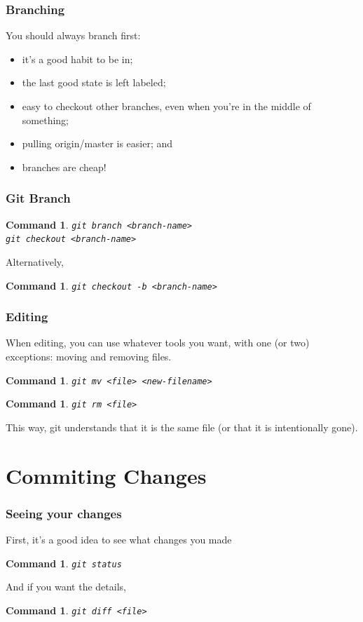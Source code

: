 \documentclass{beamer}
\newtheorem{command}[theorem]{Command}
\begin{document}
\begin{frame}
    \frametitle{Branching}
    You should always branch first:
    \pause
    \begin{itemize}
        \item it's a good habit to be in;
        \item the last good state is left labeled;
        \item easy to checkout other branches, even when you're in the middle of something;
        \item pulling origin/master is easier; and
        \item branches are cheap!
    \end{itemize}
\end{frame}

\begin{frame}
    \frametitle{Git Branch}
    \begin{command}
        \texttt{git branch <branch-name>}\\
        \texttt{git checkout <branch-name>}
    \end{command}
    Alternatively,
    \begin{command}
        \texttt{git checkout -b <branch-name>}
    \end{command}
\end{frame}


\begin{frame}
    \frametitle{Editing}
    When editing, you can use whatever tools you want, with one (or two) exceptions:
    \pause
    moving and removing files.
    \begin{command}
        \texttt{git mv <file> <new-filename>}
    \end{command}
    \begin{command}
        \texttt{git rm <file>}
    \end{command}
    This way, git understands that it is the same file (or that it is intentionally gone).
\end{frame}


\section{Commiting Changes}

\begin{frame}
    \frametitle{Seeing your changes}
    First, it's a good idea to see what changes you made
    \begin{command}
        \texttt{git status}
    \end{command}
    \pause
    And if you want the details,
    \begin{command}
        \texttt{git diff <file>}
    \end{command}
\end{frame}
\end{document}
